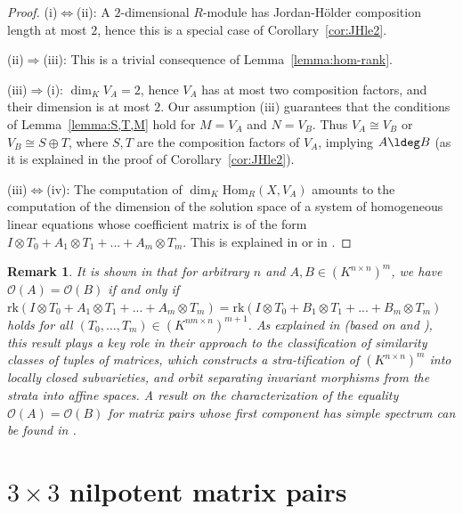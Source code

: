 \documentclass[12pt]{amsart}
\newtheorem{remark}[theorem]{\bf Remark}
\newcommand{\field}{K}
\renewcommand{\hom}{\mathrm{Hom}}
\begin{document}
\begin{proof} (i)$\iff$(ii): 
A $2$-dimensional $R$-module has Jordan-Hölder composition length at most $2$, 
hence this is a special case of Corollary~\ref{cor:JHle2}. 

(ii)$\Longrightarrow$(iii): This is a trivial consequence of Lemma~\ref{lemma:hom-rank}. 

(iii)$\Longrightarrow$(i): $\dim_\field V_A= 2$, hence $V_A$ has at most 
two composition factors, and their dimension is at most $2$. 
Our assumption (iii) guarantees that the conditions of Lemma~\ref{lemma:S,T,M} 
hold for $M=V_A$ and $N=V_B$. 
Thus $V_A\cong V_B$ or $V_B\cong S\oplus T$, where  $S,T$ are the composition factors of 
$V_A$, implying $A\ldeg B$ (as it is explained in the proof of Corollary~\ref{cor:JHle2}). 
    
(iii)$\iff$(iv): The computation of $\dim_{\field}\hom_{R}(X, V_A)$ amounts to 
the computation of the dimension of the solution space of a system of homogeneous linear equations 
whose coefficient matrix is of the form 
$I \otimes T_0 + A_1 \otimes T_1 + ... + A_m \otimes T_m$. 
This is explained in \cite[Lemma 3.3]{DKMV} or in \cite{Bongartz-Friedland}. 
\end{proof}

\begin{remark}
It is shown in \cite[Theorem 1.1]{DKMV} that 
for arbitrary $n$ and $A,B\in (\field^{n\times n})^m$, we have 
$\mathcal{O}(A)=\mathcal{O}(B)$ if and only if 
$ \mathrm{rk}(I \otimes T_0 + A_1 \otimes T_1 + ... + A_m \otimes T_m) = \mathrm{rk}(I \otimes T_0 + B_1 \otimes T_1 + ... + B_m \otimes T_m)$ holds for all 
$(T_0,\dots,T_m)\in (\field^{nm\times n})^{m+1}$. 
As explained in \cite{Bongartz-Friedland} (based on \cite{Friedland} and \cite{Bongartz:Comm.Alg}), 
this result plays a key role in their approach to the classification of similarity classes of tuples of matrices, 
which constructs a stra-tification of 
$(\field^{n\times n})^m$ into locally closed subvarieties, and orbit separating invariant morphisms from the strata into affine spaces. A result on the characterization of the equality $\mathcal{O}(A)=\mathcal{O}(B)$ for matrix pairs whose first component has simple spectrum can be found in \cite{Calderon-Lopatin}. 
\end{remark}

\section{\texorpdfstring{$3\times 3$}{3x3} nilpotent matrix pairs}\label{sec:N32}
\end{document}
